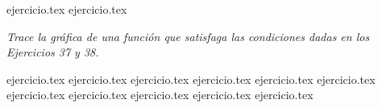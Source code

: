 \vspace{1em}
\begin{enumerate}
    \setcounter{enumi}{34}
    {ejercicio.tex}
    {ejercicio.tex}
\end{enumerate}

\noindent \textit{Trace la gráfica de una función que satisfaga las condiciones dadas en los Ejercicios 37 y 38.}

\begin{enumerate}
    \setcounter{enumi}{36}
    {ejercicio.tex}
    {ejercicio.tex}
    {ejercicio.tex}
    {ejercicio.tex}
    {ejercicio.tex}
    {ejercicio.tex}
    {ejercicio.tex}
    {ejercicio.tex}
    {ejercicio.tex}
    {ejercicio.tex}
    {ejercicio.tex}
\end{enumerate}

